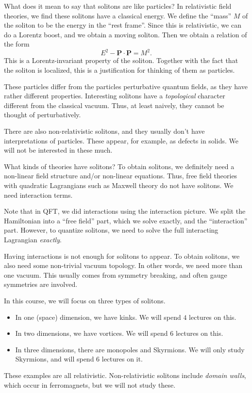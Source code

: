 \documentclass[a4paper]{article}
\begin{document}
What does it mean to say that solitons are like particles? In relativistic field theories, we find these solitons have a classical energy. We define the ``mass'' $M$ of the soliton to be the energy in the ``rest frame''. Since this is relativistic, we can do a Lorentz boost, and we obtain a moving soliton. Then we obtain a relation of the form
\[
  E^2 - \mathbf{P} \cdot \mathbf{P} = M^2.
\]
This is a Lorentz-invariant property of the soliton. Together with the fact that the soliton is localized, this is a justification for thinking of them as particles.

These particles differ from the particles perturbative quantum fields, as they have rather different properties. Interesting solitons have a \emph{topological} character different from the classical vacuum. Thus, at least naively, they cannot be thought of perturbatively.

There are also non-relativistic solitons, and they usually don't have interpretations of particles. These appear, for example, as defects in solids. We will not be interested in these much.

What kinds of theories have solitons? To obtain solitons, we definitely need a non-linear field structure and/or non-linear equations. Thus, free field theories with quadratic Lagrangians such as Maxwell theory do not have solitons. We need interaction terms.

Note that in QFT, we did interactions using the interaction picture. We split the Hamiltonian into a ``free field'' part, which we solve exactly, and the ``interaction'' part. However, to quantize solitons, we need to solve the full interacting Lagrangian \emph{exactly}.

Having interactions is not enough for solitons to appear. To obtain solitons, we also need some non-trivial vacuum topology. In other words, we need more than one vacuum. This usually comes from symmetry breaking, and often gauge symmetries are involved.

In this course, we will focus on three types of solitons.
\begin{itemize}
  \item In one (space) dimension, we have kinks. We will spend $4$ lectures on this.

  \item In two dimensions, we have vortices. We will spend $6$ lectures on this.

  \item In three dimensions, there are monopoles and Skyrmions. We will only study Skyrmions, and will spend $6$ lectures on it.
\end{itemize}
These examples are all relativistic. Non-relativistic solitons include \emph{domain walls}, which occur in ferromagnets, but we will not study these.
\end{document}
